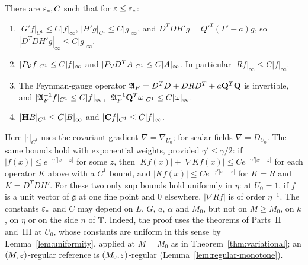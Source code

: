 \begin{lemma}\label{lem:sup-bounds}
There are $\varepsilon_*,C$ such that for $\varepsilon\le\varepsilon_*$:
\begin{enumerate}[label=(\alph*)]
\item $|G'f|_{C^1}\le C|f|_\infty$, $|H'g|_{C^1}\le C|g|_\infty$, and $D^TDH'g=Q'^T(\Gamma'-a)g$, so $|D^TDH'g|_\infty\le C|g|_\infty$.
\item $|P_\mathcal V f|_{C^1}\le C|f|_\infty$ and $|P_\mathcal V D^TA|_{C^1}\le C|A|_\infty$. In particular $|Rf|_\infty\le C|f|_\infty$.
\item The Feynman-gauge operator $\mathfrak A_F=D^TD+DRD^T+a\mathbf Q^T\mathbf Q$ is invertible, and $|\mathfrak A_F^{-1}f|_{C^1}\le C|f|_\infty$, $|\mathfrak A_F^{-1}\mathbf Q^T\omega|_{C^1}\le C|\omega|_\infty$.
\item $|\mathbf H B|_{C^1}\le C|B|_\infty$ and $|\mathbf C f|_{C^1}\le C|f|_\infty$.
\end{enumerate}
Here $|\cdot|_{C^1}$ uses the covariant gradient $\nabla=\nabla_{U_0}$; for scalar fields $\nabla=D_{U_0}$. The same bounds hold with exponential weights, provided $\gamma'\le\gamma/2$: if $|f(x)|\le e^{-\gamma'|x-z|}$ for some $z$, then $|Kf(x)|+|\nabla Kf(x)|\le Ce^{-\gamma'|x-z|}$ for each operator $K$ above with a $C^1$ bound, and $|Kf(x)|\le Ce^{-\gamma'|x-z|}$ for $K=R$ and $K=D^TDH'$. For these two only sup bounds hold uniformly in $\eta$: at $U_0=1$, if $f$ is a unit vector of $\mathfrak g$ at one fine point and $0$ elsewhere, $|\nabla Rf|$ is of order $\eta^{-1}$. The constants $\varepsilon_*$ and $C$ may depend on $L$, $G$, $a$, $\alpha$ and $M_0$, but not on $M\ge M_0$, on $k$, on $\eta$ or on the side $n$ of $\mathbb T$. Indeed, the proof uses the theorems of Parts~II and~III at $U_0$, whose constants are uniform in this sense by Lemma~\ref{lem:uniformity}, applied at $M=M_0$ as in Theorem~\ref{thm:variational}; an $(M,\varepsilon)$-regular reference is $(M_0,\varepsilon)$-regular (Lemma~\ref{lem:regular-monotone}).
\end{lemma}

